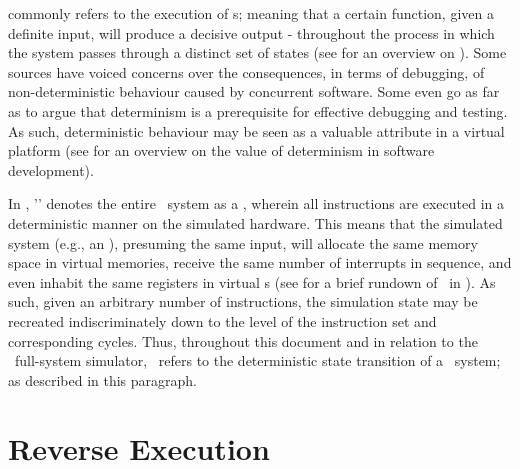  commonly refers to the execution of \dvttermdeterministicalgorithm s; meaning that a certain function, given a definite input, will produce a decisive output - throughout the process in which the system passes through a distinct set of states (see  for an overview on ).
Some sources have voiced concerns over the consequences, in terms of debugging, of non-deterministic behaviour caused by concurrent software.
Some even go as far as to argue that determinism is a prerequisite for effective debugging and testing.
As such, deterministic behaviour may be seen as a valuable attribute in a virtual platform (see  for an overview on the value of determinism in software development).

In \dvttermsimics , '\dvttermdeterministicexecution ' denotes the entire \dvttermtarget\ system as a \dvttermdeterministicalgorithm , wherein all instructions are executed in a deterministic manner on the simulated hardware.
This means that the simulated system (e.g., an \dvttermos ), presuming the same input, will allocate the same memory space in virtual memories, receive the same number of interrupts in sequence, and even inhabit the same registers in virtual \dvttermcpu s (see  for a brief rundown of \dvttermdeterministicexecution\ in \dvttermsimics ).
As such, given an arbitrary number of instructions, the simulation state may be recreated indiscriminately down to the level of the instruction set and corresponding cycles.
Thus, throughout this document and in relation to the \dvttermsimics\ full-system simulator, \dvttermdeterministicexecution\ refers to the deterministic state transition of a \dvttermtarget\ system; as described in this paragraph.

\section*{Reverse Execution}
\label{sec:appendixa_reverseexecution}


